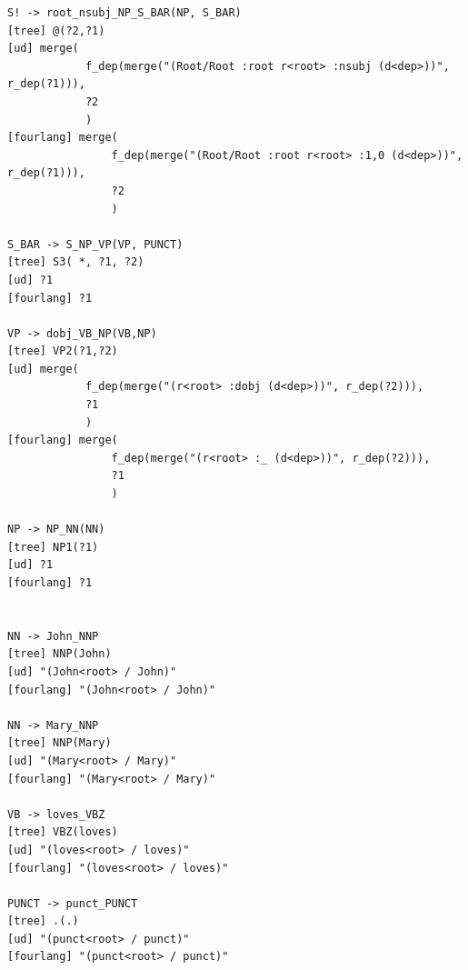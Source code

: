 \begin{verbatim}
S! -> root_nsubj_NP_S_BAR(NP, S_BAR)
[tree] @(?2,?1)
[ud] merge(
			f_dep(merge("(Root/Root :root r<root> :nsubj (d<dep>))", r_dep(?1))),
			?2
			)
[fourlang] merge(
				f_dep(merge("(Root/Root :root r<root> :1,0 (d<dep>))", r_dep(?1))),
				?2
				)

S_BAR -> S_NP_VP(VP, PUNCT)
[tree] S3( *, ?1, ?2)
[ud] ?1
[fourlang] ?1

VP -> dobj_VB_NP(VB,NP)
[tree] VP2(?1,?2)
[ud] merge(
			f_dep(merge("(r<root> :dobj (d<dep>))", r_dep(?2))),
			?1
			)
[fourlang] merge(
				f_dep(merge("(r<root> :_ (d<dep>))", r_dep(?2))),
				?1
				)

NP -> NP_NN(NN)
[tree] NP1(?1)
[ud] ?1
[fourlang] ?1


NN -> John_NNP
[tree] NNP(John)
[ud] "(John<root> / John)"
[fourlang] "(John<root> / John)"

NN -> Mary_NNP
[tree] NNP(Mary)
[ud] "(Mary<root> / Mary)"
[fourlang] "(Mary<root> / Mary)"

VB -> loves_VBZ
[tree] VBZ(loves)
[ud] "(loves<root> / loves)"
[fourlang] "(loves<root> / loves)"

PUNCT -> punct_PUNCT
[tree] .(.)
[ud] "(punct<root> / punct)"
[fourlang] "(punct<root> / punct)"
\end{verbatim}

